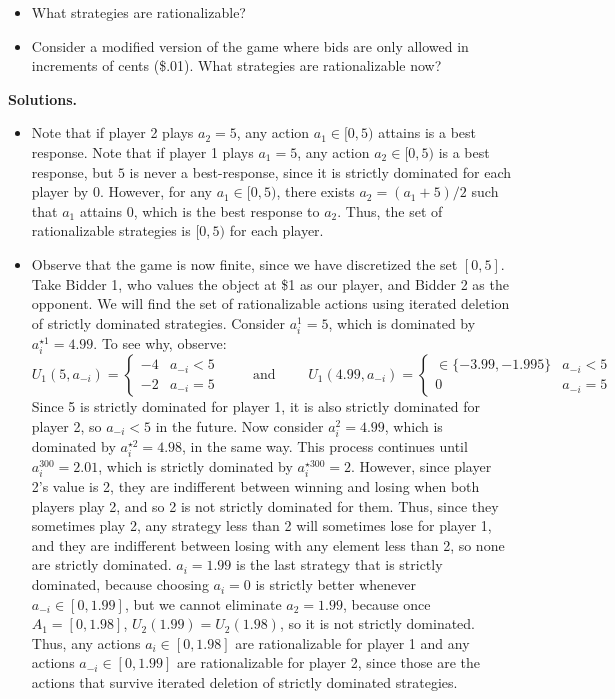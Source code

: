 \documentclass[10pt]{article}
\begin{document}
\begin{itemize}
	\item[(a)] What strategies are rationalizable?
	\item[(b)] Consider a modified version of the game where bids are only allowed in increments of cents (\$.01). What strategies are rationalizable now? 
\end{itemize}
\textbf{Solutions.}
	\begin{itemize}
		\item[(a)] Note that if player 2 plays $a_{2} = 5$, any action $a_1 \in [0,5)$ attains is a best response. Note that if player 1 plays $a_1 = 5$, any action $a_2 \in [0,5)$ is a best response, but $5$ is never a best-response, since it is strictly dominated for each player by 0. However, for any $a_1 \in [0,5)$, there exists $a_2 = (a_1 + 5) / 2$ such that $a_1$ attains 0, which is the best response to $a_2$. Thus, the set of rationalizable strategies is $[0,5)$ for each player.
		
		\item[(b)] Observe that the game is now finite, since we have discretized the set $[0,5]$. Take Bidder 1, who values the object at \$1 as our player, and Bidder 2 as the opponent. We will find the set of rationalizable actions using iterated deletion of strictly dominated strategies. Consider $a_i^1 = 5$, which is dominated by $a_i^{\star1} = 4.99$. To see why, observe:
		\[
		U_1(5,a_{-i}) = \begin{cases} -4 & a_{-i} < 5 \\ -2 & a_{-i} = 5 \end{cases} \qquad \text{ and } \qquad  U_1(4.99,a_{-i}) = \begin{cases} \in\{-3.99,-1.995\} & a_{-i} < 5 \\ 0 & a_{-i} = 5 \end{cases}
		\]
		Since 5 is strictly dominated for player 1, it is also strictly dominated for player 2, so $a_{-i} < 5$ in the future. Now consider $a_i^2 = 4.99$, which is dominated by $a_i^{\star2} = 4.98$, in the same way. This process continues until $a_i^{300} = 2.01$, which is strictly dominated by $a_i^{\star300} = 2$. However, since player 2's value is 2, they are indifferent between winning and losing when both players play 2, and so 2 is not strictly dominated for them. Thus, since they sometimes play 2, any strategy less than 2 will sometimes lose for player 1, and they are indifferent between losing with any element less than 2, so none are strictly dominated. $a_i = 1.99$ is the last strategy that is strictly dominated, because choosing $a_i = 0$ is strictly better whenever $a_{-i} \in [0,1.99]$, but we cannot eliminate $a_2 = 1.99$, because once $A_1 = [0,1.98]$, $U_2(1.99) = U_2(1.98)$, so it is not strictly dominated. Thus, any actions $a_i \in [0,1.98]$ are rationalizable for player 1 and any actions $a_{-i} \in [0,1.99]$ are rationalizable for player 2, since those are the actions that survive iterated deletion of strictly dominated strategies.
	\end{itemize}
\end{document}
